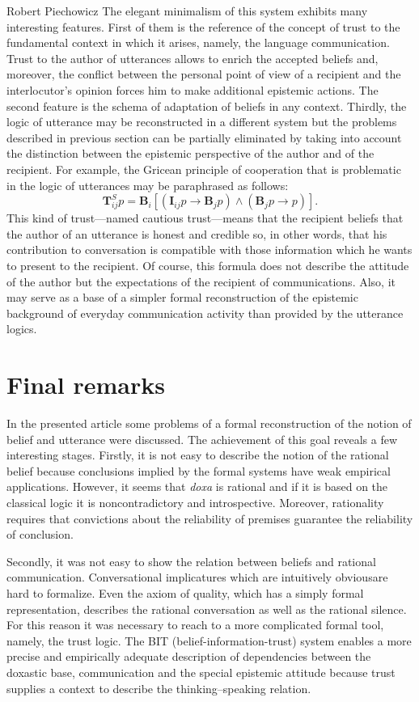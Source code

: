 \begin{artengenv}{Robert Piechowicz}
The elegant minimalism of this system exhibits many interesting features. First of them is the reference of the concept of trust to the fundamental context in which it arises, namely, the language communication. Trust to the author of utterances allows to enrich the accepted beliefs and, moreover, the conflict between the personal point of view of a recipient and the interlocutor’s opinion forces him to make additional epistemic actions. The second feature is the schema of adaptation of beliefs in any context. Thirdly, the logic of utterance may be reconstructed in a different system but the problems described in previous section can be partially eliminated by taking into account the distinction between the epistemic perspective of the author and of the recipient. For example, the Gricean principle of cooperation that is problematic in the logic of utterances may be paraphrased as follows:
$$\mathbf{T}^{S}_{ij}p = \mathbf{B}_{i}[(\mathbf{I}_{ij}p\rightarrow \mathbf{B}_{j}p)\wedge (\mathbf{B}_{j}p\rightarrow p)].$$
This kind of trust---named cautious trust---means that the recipient beliefs that the author of an utterance is honest and credible so, in other words, that his contribution to conversation is  compatible with those information which he wants to present to the recipient. Of course, this formula does not describe the attitude of the author but the expectations of the recipient of communications. Also, it may serve as a base of a simpler formal reconstruction of the epistemic background of everyday communication activity than provided by the utterance logics.

\section{Final remarks}

\indent In the presented article some problems of a formal reconstruction of the notion of belief and utterance were discussed. The achievement of this goal reveals a few interesting stages. Firstly, it is not easy to describe the notion of the rational belief because conclusions implied by the formal systems have weak empirical applications. However, it seems that \textit{doxa} is rational and if it is based on the classical logic it is noncontradictory and introspective. Moreover, rationality requires that convictions about the reliability of premises guarantee the reliability of conclusion.

Secondly, it was not easy to show the relation between beliefs and rational communication. Conversational implicatures which are intuitively obviousare hard to formalize. Even the axiom of quality, which has a simply formal representation, describes the rational conversation as well as the rational silence. For this reason it was necessary to reach to a more complicated formal tool, namely, the trust logic. The BIT (belief-information-trust) system enables a more precise and empirically adequate description of dependencies between the doxastic base, communication and the special epistemic attitude because trust supplies a context to describe the thinking--speaking relation.


\end{artengenv}
